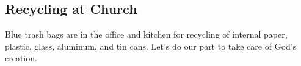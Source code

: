 \vspace{\fill}

\subsection{Recycling at Church}
\label{timeofresponse}

Blue trash bags are in the office and kitchen for recycling of internal paper, plastic, glass, aluminum, and tin cans. Let's do our part to take care of God's creation.

\vspace{\fill}